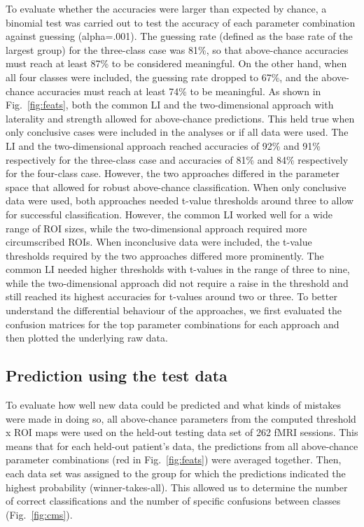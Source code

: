 \documentclass[fleqn,10pt]{SelfArx} %
\begin{document}
To evaluate whether the accuracies were larger than expected by chance, a binomial test was carried out to test the accuracy of each parameter combination against guessing (alpha=.001). The guessing rate (defined as the base rate of the largest group) for the three-class case was 81\%, so that above-chance accuracies must reach at least 87\% to be considered meaningful. On the other hand, when all four classes were included, the guessing rate dropped to 67\%, and the above-chance accuracies must reach at least 74\% to be meaningful. As shown in Fig.~\ref{fig:feats}, both the common LI and the two-dimensional approach with laterality and strength allowed for above-chance predictions. This held true when only conclusive cases were included in the analyses or if all data were used. The LI and the two-dimensional approach reached accuracies of 92\% and 91\% respectively for the three-class case and accuracies of 81\% and 84\% respectively for the four-class case. However, the two approaches differed in the parameter space that allowed for robust above-chance classification. When only conclusive data were used, both approaches needed t-value thresholds around three to allow for successful classification. However, the common LI worked well for a wide range of ROI sizes, while the two-dimensional approach required more circumscribed ROIs. When inconclusive data were included, the t-value thresholds required by the two approaches differed more prominently. The common LI needed higher thresholds with t-values in the range of three to nine, while the two-dimensional approach did not require a raise in the threshold and still reached its highest accuracies for t-values around two or three. To better understand the differential behaviour of the approaches, we first evaluated the confusion matrices for the top parameter combinations for each approach and then plotted the underlying raw data.

\subsection{Prediction using the test data}
To evaluate how well new data could be predicted and what kinds of mistakes were made in doing so, all above-chance parameters from the computed threshold x ROI maps were used on the held-out testing data set of 262 fMRI sessions. This means that for each held-out patient’s data, the predictions from all above-chance parameter combinations (red in Fig.~\ref{fig:feats}) were averaged together. Then, each data set was assigned to the group for which the predictions indicated the highest probability (winner-takes-all). This allowed us to determine the number of correct classifications and the number of specific confusions between classes (Fig.~\ref{fig:cms}).
\end{document}
